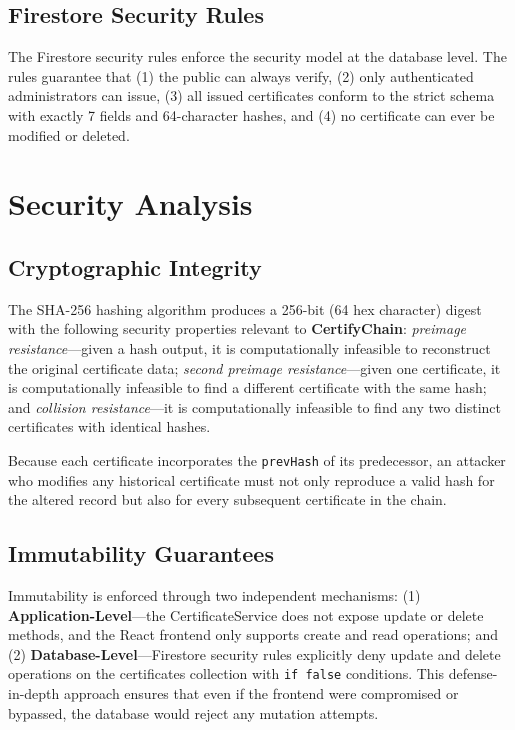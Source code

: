 \documentclass[10pt,twocolumn,a4paper]{article}
\newcommand{\certifychain}{\textbf{CertifyChain}}
\begin{document}
\subsection{Firestore Security Rules}

The Firestore security rules enforce the security model at the database level. The rules guarantee that (1) the public can always verify, (2) only authenticated administrators can issue, (3) all issued certificates conform to the strict schema with exactly 7 fields and 64-character hashes, and (4) no certificate can ever be modified or deleted.

\section{Security Analysis}

\subsection{Cryptographic Integrity}

The SHA-256 hashing algorithm produces a 256-bit (64 hex character) digest with the following security properties relevant to \certifychain{}: \textit{preimage resistance}---given a hash output, it is computationally infeasible to reconstruct the original certificate data; \textit{second preimage resistance}---given one certificate, it is computationally infeasible to find a different certificate with the same hash; and \textit{collision resistance}---it is computationally infeasible to find any two distinct certificates with identical hashes.

Because each certificate incorporates the \texttt{prevHash} of its predecessor, an attacker who modifies any historical certificate must not only reproduce a valid hash for the altered record but also for every subsequent certificate in the chain.

\subsection{Immutability Guarantees}

Immutability is enforced through two independent mechanisms: (1) \textbf{Application-Level}---the CertificateService does not expose update or delete methods, and the React frontend only supports create and read operations; and (2) \textbf{Database-Level}---Firestore security rules explicitly deny update and delete operations on the certificates collection with \texttt{if false} conditions. This defense-in-depth approach ensures that even if the frontend were compromised or bypassed, the database would reject any mutation attempts.
\end{document}
